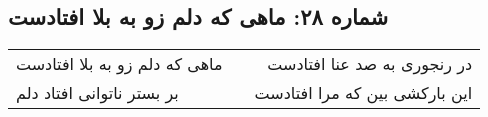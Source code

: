 \begin{center}
\section*{شماره ۲۸: ماهی که دلم زو به بلا افتادست}
\label{sec:028}
\begin{longtable}{l p{0.5cm} r}
ماهی که دلم زو به بلا افتادست
&&
در رنجوری به صد عنا افتادست
\\
بر بستر ناتوانی افتاد دلم
&&
این بارکشی بین که مرا افتادست
\\
\end{longtable}
\end{center}
